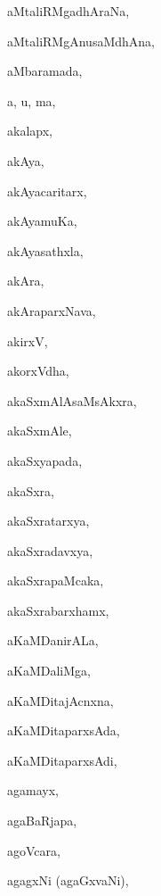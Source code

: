 \begin{multicols}{3}
{\noindent
{aMtaliRMgadhAraNa}, \pageref{aMtaliRMgadhAraNa}

\noindent
{aMtaliRMgAnusaMdhAna}, \pageref{aMtaliRMgAnusaMdhAna}

\noindent
{aMbaramada}, \pageref{aMbaramada}

\noindent
{a, u, ma}, \pageref{a, u, ma}

\noindent
{akalapx}, \pageref{akalapx}

\noindent
{akAya}, \pageref{akAya}

\noindent
{akAyacaritarx}, \pageref{akAyacaritarx}

\noindent
{akAyamuKa}, \pageref{akAyamuKa}

\noindent
{akAyasathxla}, \pageref{akAyasathxla}

\noindent
{akAra}, \pageref{akAra}

\noindent
{akAraparxNava}, \pageref{akAraparxNava}

\noindent
{akirxV}, \pageref{akirxV}

\noindent
{akorxVdha}, \pageref{akorxVdha}

\noindent
{akaSxmAlAsaMsAkxra}, \pageref{akaSxmAlAsaMsAkxra}

\noindent
{akaSxmAle}, \pageref{akaSxmAle}

\noindent
{akaSxyapada}, \pageref{akaSxyapada}

\noindent
{akaSxra}, \pageref{akaSxra}

\noindent
{akaSxratarxya}, \pageref{akaSxratarxya}

\noindent
{akaSxradavxya}, \pageref{akaSxradavxya}

\noindent
{akaSxrapaMcaka}, \pageref{akaSxrapaMcaka}

\noindent
{akaSxrabarxhamx}, \pageref{akaSxrabarxhamx}

\noindent
{aKaMDanirALa}, \pageref{aKaMDanirALa}

\noindent
{aKaMDaliMga}, \pageref{aKaMDaliMga}

\noindent
{aKaMDitajAcnxna}, \pageref{aKaMDitajAcnxna}

\noindent
{aKaMDitaparxsAda}, \pageref{aKaMDitaparxsAda}

\noindent
{aKaMDitaparxsAdi}, \pageref{aKaMDitaparxsAdi}

\noindent
{agamayx}, \pageref{agamayx}

\noindent
{agaBaRjapa}, \pageref{agaBaRjapa}

\noindent
{agoVcara}, \pageref{agoVcara}

\noindent
{agagxNi (agaGxvaNi)}, \pageref{agagxNi (agaGxvaNi)}

}
\end{multicols}
